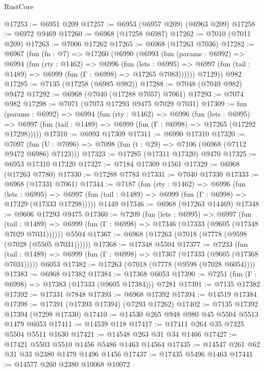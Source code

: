 \begin{lexlean}{RustCore}
\begin{coremodule}
@17253 := @6951 @209
@17257 := @6953 (@6957 @209) (@6963 @209)
@17258 := @6972 @9469
@17260 := @6968 (@17258 @6987)
@17262 := @7010 (@7011 @209)
@17263 := @7006 @17262
@17265 := @6968 (@17263 @7036)
@17282 := @6967
    (fun (fn : @7) =>
    @17260
      (@6990
        (@6993
          (fun (params : @6992) =>
          @6994
            (fun (rty : @1462) =>
            @6996
              (fun (lets : @6995) =>
              @6997 (fun (tail : @1489) => @6999 (fun (Γ : @6998) => @17265 @7083))))))
        @7129))
    @982
@17285 := @7135 (@17258 (@6985 @982))
@17288 := @7048 (@7049 @982) @9472
@17292 := @6968 (@7040 (@17288 @7057) @7061)
@17293 := @7074 @982
@17298 := @7071 (@7073 @17293 @9475 @7029 @7031)
@17309 := fun (params : @6992) =>
  @6994
    (fun (rty : @1462) =>
    @6996
      (fun (lets : @6995) =>
      @6997 (fun (tail : @1489) => @6999 (fun (Γ : @6998) => @17265 (@17292 @17298)))))
@17310 := @6993 @17309
@17311 := @6990 @17310
@17320 := @7097
    (fun (U : @7096) => @7098 (fun (t : @29) => @7106 (@6968 (@7112 @9472 @6986) @7123)))
@17323 := @17285 (@17311 @17320) @9470
@17325 := @6953 @17310 @17320
@17327 := @7184 @17309 @1561
@17329 := @6968 (@17263 @7780)
@17330 := @17288 @7783
@17331 := @7040 @17330
@17333 := @6968 (@17331 @7061)
@17344 := @7187
    (fun (rty : @1462) =>
    @6996
      (fun (lets : @6995) =>
      @6997 (fun (tail : @1489) => @6999 (fun (Γ : @6998) => @17329 (@17333 @17298)))))
    @1449
@17346 := @6968 (@17263 @14469)
@17348 := @9606 @17293 @9475
@17360 := @7209
    (fun (lets : @6995) =>
    @6997
      (fun (tail : @1489) =>
      @6999 (fun (Γ : @6998) => @17346 (@17333 (@9605 (@17348 @7029 @7031))))))
    @5504
@17367 := @6968 (@17263 (@7018 (@7778 (@9598 (@7028 (@5505 @7031))))))
@17368 := @17348 @5504
@17377 := @7233
    (fun (tail : @1489) => @6999 (fun (Γ : @6998) => @17367 (@17333 (@9605 (@17368 @7031)))))
    @6053
@17382 := @17263 (@7018 (@7778 (@9598 (@7028 @6054))))
@17383 := @6968 @17382
@17384 := @17368 @6053
@17390 := @7251 (fun (Γ : @6998) => @17383 (@17333 (@9605 @17384))) @7281
@17391 := @7135 @17382
@17392 := @17331 @7848
@17393 := @6968 @17392
@17394 := @14519 @17384
@17398 := @17391 (@17393 @17394) (@7293 @17262)
@17402 := @7135 @17392 @17394 (@7298 @17330)
@17410 := @14530 @265 @948 @980 @45 @5504 @5513 @1479 @6053
@17411 := @14539 @118
@17417 := @17411 @264 @35 @7325 @5504 @5511 @1630
@17421 := @14548 @263 @31 @34 @1466
@17427 := @17421 @5503 @5510 @1456 @5486 @1463 @14564
@17435 := @14547 @261 @62 @31 @33 @2380 @1479 @1496 @1456
@17437 := @17435 @5496 @1463
@17441 := @14577 @260 @2380 @10068 @10072

\end{coremodule}
\end{lexlean}

